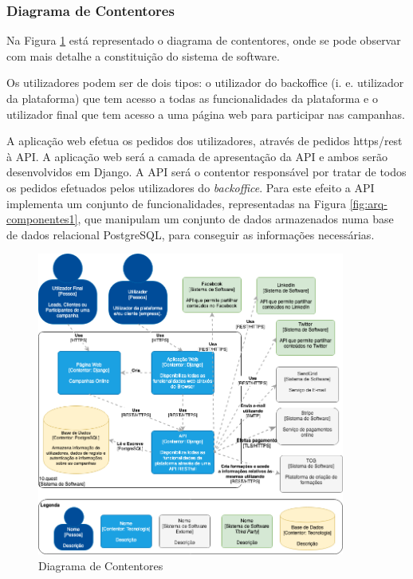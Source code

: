 \subsubsection{Diagrama de Contentores}

Na Figura \ref{fig:arq-contentores} está representado o diagrama de contentores, onde se pode observar com mais detalhe a constituição do sistema de software.

Os utilizadores podem ser de dois tipos: o utilizador do backoffice (i. e. utilizador da plataforma) que tem acesso a todas as funcionalidades da plataforma e o utilizador final que tem acesso a uma página web para participar nas campanhas.

A aplicação web efetua os pedidos dos utilizadores, através de pedidos \acrshort{https}/\acrshort{rest} à API. A aplicação web será a camada de apresentação da API e ambos serão desenvolvidos em Django. A API será o contentor responsável por tratar de todos os pedidos efetuados pelos utilizadores do \textit{backoffice}. Para este efeito a API implementa um conjunto de funcionalidades, representadas na Figura \ref{fig:arq-componentes1}, que manipulam um conjunto de dados armazenados numa base de dados relacional PostgreSQL, para conseguir as informações necessárias.
\newpage

\begin{figure}[ht!]
	\begin{center}
		\includegraphics[width=0.9\textwidth]{img/arq/diagrama-contentores}
		\caption{Diagrama de Contentores}
		\label{fig:arq-contentores}
	\end{center}
\end{figure}

